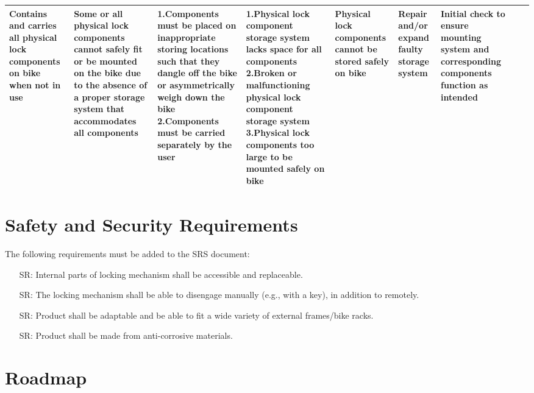 \documentclass{article}
\newcounter{srnum} %
\begin{document}
\begin{table}[H]
\begin{tabular}{| p{} | p{}  | p{} | p{} | p{} | p{} | p{} | p{} | p{} |}
Contains and carries all physical lock components on bike when not in use & Some or all physical lock components cannot safely fit or be mounted on the bike due to the absence of a proper storage system that accommodates all components & 1.Components must be placed on inappropriate storing locations such that they dangle off the bike or asymmetrically weigh down the bike \newline 2.Components must be carried separately by the user & 1.Physical lock component storage system lacks space for all components \newline 2.Broken or malfunctioning physical lock component storage system \newline 3.Physical lock components too large to be mounted safely on bike & Physical lock components cannot be stored safely on bike & Repair and/or expand faulty storage system & Initial check to ensure mounting system and corresponding components function as intended &  &  \\ \hline
\end{tabular}
\end{table}

\section{Safety and Security Requirements}

The following requirements must be added to the SRS document:
\begin{itemize}
\item[SR\refstepcounter{srnum}\thesrnum\label{SR1}:] Internal parts of locking mechanism shall be accessible and replaceable.
\item[SR\refstepcounter{srnum}\thesrnum\label{SR2}:] The locking mechanism shall be able to disengage manually (e.g., with a key), in addition to remotely.
\item[SR\refstepcounter{srnum}\thesrnum\label{SR3}:] Product shall be adaptable and be able to fit a wide variety of external frames/bike racks.
\item[SR\refstepcounter{srnum}\thesrnum\label{SR4}:] Product shall be made from anti-corrosive materials. 




\end{itemize}


\section{Roadmap}
\end{document}
